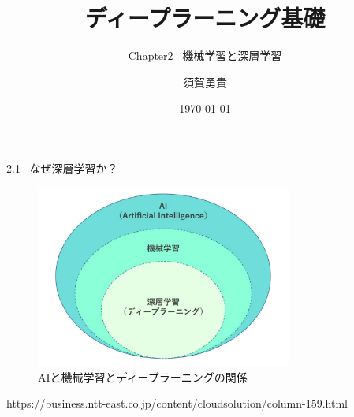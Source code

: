 \documentclass[dvipdfmx,10pt]{beamer}
\title{ディープラーニング基礎}
\subtitle{Chapter2 \ 機械学習と深層学習}
\author[須賀]{須賀勇貴}
\institute[茨大]{茨城大学大学院 \ 理工学研究科 \ 量子線科学専攻 \ 1年}
\date{\today}
\begin{document}
\frame{\maketitle}

  \begin{frame}{2.1 \ なぜ深層学習か？}
    \begin{figure}
      \begin{center}
        \includegraphics[height=6cm]{./AI_ML_DL.png}
      \end{center} 
      \caption{AIと機械学習とディープラーニングの関係}  
    \end{figure}
    https://business.ntt-east.co.jp/content/cloudsolution/column-159.html
  \end{frame}
\end{document}
